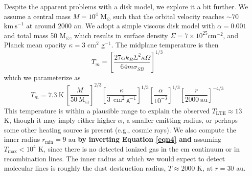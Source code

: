\documentclass[]{aastex631}
\newcommand{\msun}{\ensuremath{\mathrm{M}_\odot}\xspace}
\newcommand{\kms}{\ensuremath{\mathrm{km~s}^{-1}}\xspace}
\newcommand{\persc}{\ensuremath{\mathrm{cm}^{-2}}\xspace}
\def\rr#1{\textbf{#1}}
\begin{document}
Despite the apparent problems with a disk model, we explore it a bit further.
We assume a central mass $M=10^4$ \msun such that the orbital velocity reaches $\sim70$ \kms at around $2000$ au.
We adopt a simple viscous disk model with $\alpha=0.001$ and total mass 50 \msun, which results in surface density $\Sigma=7\times10^{25}\persc$, and Planck mean opacity $\kappa=3$ cm$^{2}$ g$^{-1}$.
The midplane temperature is then \rr{\citep[][problem set 4]{Krumholz2015}}
\begin{equation}
    T_m = \left[\frac{27  \alpha k_B  \Sigma^2 \kappa \Omega}{64 m \sigma_{SB}}\right]^{1/3}
\end{equation}
which we parameterize as
\begin{equation}
\label{eqn4}
T_m = 7.3 \mathrm{~K~}
        \left[\frac{M}{50~\mathrm{M}_\odot}\right]^{2/3}
        \left[\frac{\kappa}{3~\mathrm{~cm^2~g^{-1}}}\right]^{1/3}
        \left[\frac{\alpha}{10^{-3}}\right]^{1/3}
        \left[\frac{r}{2000~\mathrm{au}}\right]^{-4/3}
\end{equation}
This temperature is within a plausible range to explain the observed $T_\mathrm{LTE}\approx13$ K, though it may imply either higher $\alpha$, a smaller emitting radius, or perhaps some other heating source is present (e.g., cosmic rays).
We also compute the inner radius $r_\mathrm{min}=9$ au \rr{by inverting Equation \ref{eqn4} and} assuming $T_\mathrm{max} < 10^4$ K, since there is no detected ionized gas in the cm continuum or in recombination lines.
The inner radius at which we would expect to detect molecular lines is roughly the dust destruction radius, $T\approx2000$ K, at $r=30$ au.


\end{document}
